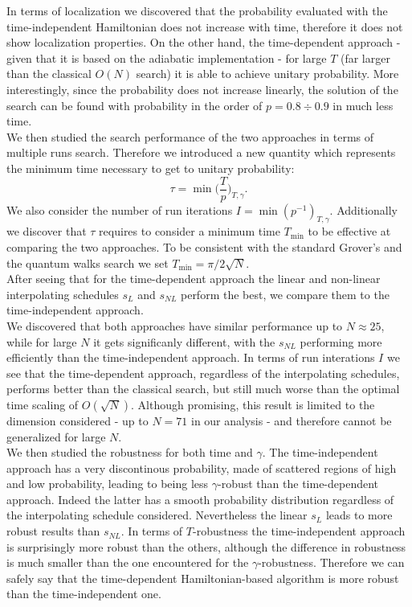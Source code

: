 In terms of localization we discovered that the probability evaluated with the time-independent Hamiltonian does not increase with time, therefore it does not show localization properties. On the other hand, the time-dependent approach - given that it is based on the adiabatic implementation - for large $T$ (far larger than the classical $O(N)$ search) it is able to achieve unitary probability. More interestingly, since the probability does not increase linearly, the solution of the search can be found with probability in the order of $p=0.8\div 0.9$ in much less time. \\


We then studied the search performance of the two approaches in terms of multiple runs search. Therefore we introduced a new quantity which represents the minimum time necessary to get to unitary probability:
\begin{equation*}
  \tau = \min\Big(\frac{T}{p}\Big)_{T,\gamma}.
\end{equation*}
We also consider the number of run iterations $I=\min(p^{-1})_{T,\gamma}$. Additionally we discover that $\tau$ requires to consider a minimum time $T_{\min}$ to be effective at comparing the two approaches. To be consistent with the standard Grover's and the quantum walks search we set $T_{\min} = \pi/2\sqrt{N}$. \\


After seeing that for the time-dependent approach the linear and non-linear interpolating schedules $s_L$ and $s_{NL}$ perform the best, we compare them to the time-independent approach.\\
We discovered that both approaches have similar performance up to $N\approx 25$, while for large $N$ it gets significanly different, with the $s_{NL}$ performing more efficiently than the time-independent approach. In terms of run interations $I$ we see that the time-dependent approach, regardless of the interpolating schedules, performs better than the classical search, but still much worse than the optimal time scaling of $O(\sqrt{N})$. Although promising, this result is limited to the dimension considered - up to $N=71$ in our analysis - and therefore cannot be generalized for large $N$. \\


We then studied the robustness for both time and $\gamma$. The time-independent approach has a very discontinous probability, made of scattered regions of high and low probability, leading to being less $\gamma$-robust than the time-dependent approach. Indeed the latter has a smooth probability distribution regardless of the interpolating schedule considered. Nevertheless the linear $s_L$ leads to more robust results than $s_{NL}$. In terms of $T$-robustness the time-independent approach is surprisingly more robust than the others, although the difference in robustness is much smaller than the one encountered for the $\gamma$-robustness. Therefore we can safely say that the time-dependent Hamiltonian-based algorithm is more robust than the time-independent one. \\


